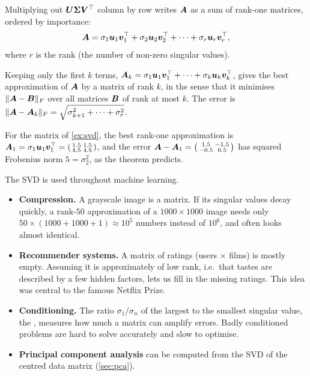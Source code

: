 Multiplying out $\bm{U}\bm{\Sigma}\bm{V}^\top$ column by row writes $\bm{A}$ as a sum of
rank-one matrices, ordered by importance:
\[
  \bm{A} = \sigma_1\bm{u}_1\bm{v}_1^\top + \sigma_2\bm{u}_2\bm{v}_2^\top + \dots
  + \sigma_r\bm{u}_r\bm{v}_r^\top ,
\]
where $r$ is the rank (the number of non-zero singular values).

\begin{theorem}\label{thm:eckart-young}
Keeping only the first $k$ terms,
$\bm{A}_k = \sigma_1\bm{u}_1\bm{v}_1^\top + \dots + \sigma_k\bm{u}_k\bm{v}_k^\top$, gives the
best approximation of $\bm{A}$ by a matrix of rank $k$, in the sense that it
minimises $\lVert\bm{A} - \bm{B}\rVert_F$ over all matrices $\bm{B}$ of rank at most $k$.
The error is $\lVert\bm{A} - \bm{A}_k\rVert_F = \sqrt{\sigma_{k+1}^2 + \dots + \sigma_r^2}$.
\end{theorem}

For the matrix of \cref{ex:svd}, the best rank-one approximation is
$\bm{A}_1 = \sigma_1\bm{u}_1\bm{v}_1^\top = \left(\begin{smallmatrix} 1.5 & 1.5\\ 4.5 &
4.5\end{smallmatrix}\right)$, and the error $\bm{A} - \bm{A}_1 =
\left(\begin{smallmatrix} 1.5 & -1.5\\ -0.5 & 0.5\end{smallmatrix}\right)$ has
squared Frobenius norm $5 = \sigma_2^2$, as the theorem predicts.

\begin{mlnote}
The SVD is used throughout machine learning.
\begin{itemize}
  \item \textbf{Compression.} A grayscale image is a matrix. If its singular
    values decay quickly, a rank-$50$ approximation of a $1000\times1000$ image
    needs only $50\times(1000 + 1000 + 1) \approx 10^5$ numbers instead of
    $10^6$, and often looks almost identical.
  \item \textbf{Recommender systems.} A matrix of ratings (users $\times$
    films) is mostly empty. Assuming it is approximately of low rank, i.e.\
    that tastes are described by a few hidden factors, lets us fill in the
    missing ratings. This idea was central to the famous Netflix Prize.
  \item \textbf{Conditioning.} The ratio $\sigma_1/\sigma_n$ of the largest to
    the smallest singular value, the \term{condition number}, measures how much
    a matrix can amplify errors. Badly conditioned problems are hard to solve
    accurately and slow to optimise.
  \item \textbf{Principal component analysis} can be computed from the SVD of
    the centred data matrix (\cref{sec:pca}).
\end{itemize}
\end{mlnote}

